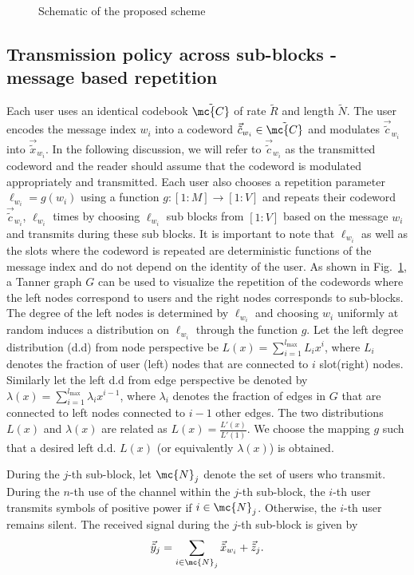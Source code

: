 \documentclass[final,onecolumn,12pt]{IEEEtran}
\begin{document}
\begin{figure}[h]
  \centering
  \resizebox{0.9\textwidth}{!}{}
  \caption{Schematic of the proposed scheme}
  \label{fig:overallscheme}
\end{figure}

\subsection{Transmission policy across sub-blocks - message based repetition}
\label{sec:Txpolicy_TannerGraph}
Each user uses an identical codebook $\tilde{\mc{C}}$ of rate $\tilde{R}$ and length $\tilde{N}$. The user encodes the message index $w_i$ into a codeword $\vec{\tilde{c}}_{w_i} \in \tilde{\mc{C}}$ and modulates $\vec{\tilde{c}}_{w_i}$ into $\vec{\tilde{x}}_{w_i}$. In the following discussion, we will refer to $\vec{\tilde{c}}_{w_i}$ as the transmitted codeword and the reader should assume that the codeword is modulated appropriately and transmitted. Each user also chooses a repetition parameter $\ell_{w_i}=g(w_i)$ using a function $g:[1:M] \rightarrow [1:V]$ and repeats their codeword $\vec{\tilde{c}}_{w_i}$, $\ell_{w_i}$ times by choosing $\ell_{w_i}$ sub blocks from $[1:V]$ based on the message $w_i$ and transmits during these sub blocks. It is important to note that $\ell_{w_i}$ as well as the slots where the codeword is repeated are deterministic functions of the message index and do not depend on the identity of the user. As shown in Fig.~\ref{fig:overallscheme}, a Tanner graph $G$ can be used to visualize the repetition of the codewords where the left nodes correspond to users and the right nodes corresponds to sub-blocks. The degree of the left nodes is determined by $\ell_{w_i}$ and choosing $w_i$ uniformly at random induces a distribution on $\ell_{w_i}$ through the function $g$.  Let the left degree distribution (d.d) from node perspective be $L(x) = \sum_{{i=1}}^{{l_{\max}}} L_i x^i$, where $L_i$ denotes the fraction of user (left) nodes that are connected to $i$ slot(right) nodes. Similarly let the left d.d from edge perspective be denoted by $\lambda(x) = \sum_{{i=1}}^{{l_{\max}}} \lambda_i x^{i-1}$, where $\lambda_i$ denotes the fraction of edges in $G$ that are connected to left nodes connected to $i-1$ other edges. The two distributions $L(x)$ and $\lambda(x)$ are related as $L(x)=\frac{L'(x)}{L'(1)}$. We choose the mapping $g$ such that a desired left d.d. $L(x)$ (or equivalently $\lambda(x)$) is obtained.

During the $j$-th sub-block, let $\mc{N}_j$ denote the set of users who transmit. During the $n$-th use of the channel within the $j$-th sub-block, the $i$-th user transmits  symbols of positive power if $i \in \mc{N}_j$. Otherwise, the $i$-th user remains silent. The received signal during the $j$-th sub-block is given by
\begin{equation}
\vec{\tilde{y}}_j = \sum_{i\in \mc{N}_j} \vec{\tilde{x}}_{w_i} + \vec{\tilde{z}}_j.
\end{equation}
\end{document}
